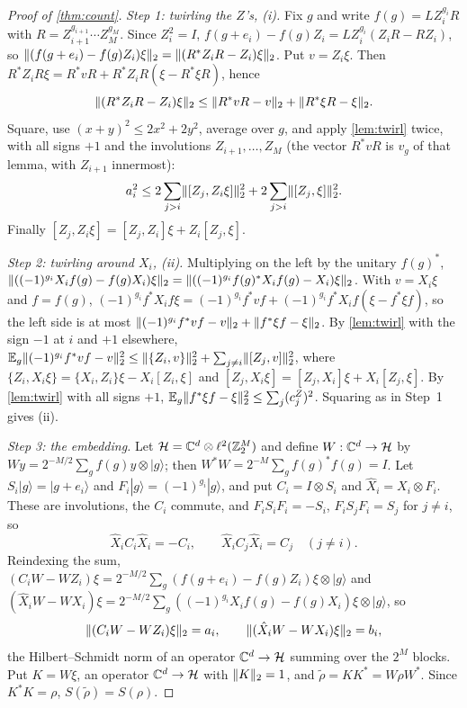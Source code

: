 \begin{proof}[Proof of \cref{thm:count}]
\emph{Step 1: twirling the $Z$'s, (i).} Fix $g$ and write $f(g)=LZ_i^{g_i}R$ with $R=Z_{i+1}^{g_{i+1}}\cdots Z_M^{g_M}$. Since $Z_i^2=I$,
$f(g+e_i)-f(g)Z_i=LZ_i^{g_i}(Z_iR-RZ_i)$, so $\lVert (f(g+e_i)-f(g)Z_i)\xi\rVert_2=\lVert (R^*Z_iR-Z_i)\xi\rVert_2$. Put $v=Z_i\xi$. Then
$R^*Z_iR\xi=R^*vR+R^*Z_iR(\xi-R^*\xi R)$, hence
\[
\lVert (R^*Z_iR-Z_i)\xi\rVert_2\le\lVert R^*vR-v\rVert_2+\lVert R^*\xi R-\xi\rVert_2.
\]
Square, use $(x+y)^2\le2x^2+2y^2$, average over $g$, and apply \cref{lem:twirl} twice, with all signs $+1$ and the involutions
$Z_{i+1},\dots,Z_M$ (the vector $R^*vR$ is $v_g$ of that lemma, with $Z_{i+1}$ innermost):
\[
a_i^2\le2\sum_{j>i}\lVert [Z_j,Z_i\xi]\rVert_2^2+2\sum_{j>i}\lVert [Z_j,\xi]\rVert_2^2 .
\]
Finally $[Z_j,Z_i\xi]=[Z_j,Z_i]\xi+Z_i[Z_j,\xi]$.

\emph{Step 2: twirling around $X_i$, (ii).} Multiplying on the left by the unitary $f(g)^*$,
$\lVert ((-1)^{g_i}X_if(g)-f(g)X_i)\xi\rVert_2=\lVert ((-1)^{g_i}f(g)^*X_if(g)-X_i)\xi\rVert_2$. With $v=X_i\xi$ and $f=f(g)$,
$(-1)^{g_i}f^*X_if\xi=(-1)^{g_i}f^*vf+(-1)^{g_i}f^*X_if(\xi-f^*\xi f)$, so the left side is at most
$\lVert (-1)^{g_i}f^*vf-v\rVert_2+\lVert f^*\xi f-\xi\rVert_2$. By \cref{lem:twirl} with the sign $-1$ at $i$ and $+1$ elsewhere,
$\mathbb E_g\lVert (-1)^{g_i}f^*vf-v\rVert_2^2\le\lVert \{Z_i,v\}\rVert_2^2+\sum_{j\ne i}\lVert [Z_j,v]\rVert_2^2$, where $\{Z_i,X_i\xi\}=\{X_i,Z_i\}\xi-X_i[Z_i,\xi]$ and
$[Z_j,X_i\xi]=[Z_j,X_i]\xi+X_i[Z_j,\xi]$. By \cref{lem:twirl} with all signs $+1$, $\mathbb E_g\lVert f^*\xi f-\xi\rVert_2^2\le\sum_j(c^Z_j)^2$. Squaring
as in Step~1 gives (ii).

\emph{Step 3: the embedding.} Let $\mathcal H=\mathbb C^d\otimes\ell^2(\mathbb Z_2^M)$ and define $W:\mathbb C^d\to\mathcal H$ by
$Wy=2^{-M/2}\sum_gf(g)y\otimes|g\rangle$; then $W^*W=2^{-M}\sum_gf(g)^*f(g)=I$. Let $S_i|g\rangle=|g+e_i\rangle$ and
$F_i|g\rangle=(-1)^{g_i}|g\rangle$, and put $C_i=I\otimes S_i$ and $\hat X_i=X_i\otimes F_i$. These are involutions, the $C_i$ commute, and
$F_iS_iF_i=-S_i$, $F_iS_jF_i=S_j$ for $j\ne i$, so
\[
\hat X_iC_i\hat X_i=-C_i,\qquad\hat X_iC_j\hat X_i=C_j\quad(j\ne i).
\]
Reindexing the sum, $(C_iW-WZ_i)\xi=2^{-M/2}\sum_g(f(g+e_i)-f(g)Z_i)\xi\otimes|g\rangle$ and
$(\hat X_iW-WX_i)\xi=2^{-M/2}\sum_g((-1)^{g_i}X_if(g)-f(g)X_i)\xi\otimes|g\rangle$, so
\[
\lVert (C_iW-WZ_i)\xi\rVert_2=a_i,\qquad\lVert (\hat X_iW-WX_i)\xi\rVert_2=b_i ,
\]
the Hilbert--Schmidt norm of an operator $\mathbb C^d\to\mathcal H$ summing over the $2^M$ blocks. Put $K=W\xi$, an operator $\mathbb C^d\to\mathcal H$
with $\lVert K\rVert_2=1$, and $\tilde\rho=KK^*=W\rho W^*$. Since $K^*K=\rho$, $S(\tilde\rho)=S(\rho)$.


\end{proof}
